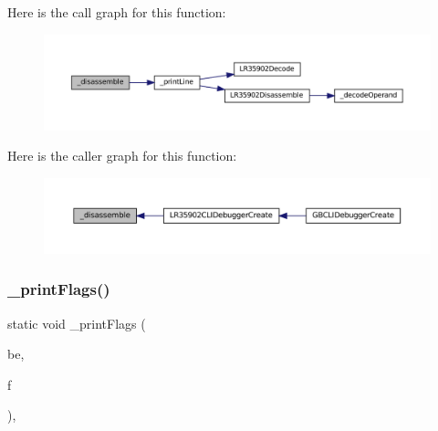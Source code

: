 Here is the call graph for this function\+:
\nopagebreak
\begin{figure}[H]
\begin{center}
\leavevmode
\includegraphics[width=350pt]{lr35902_2debugger_2cli-debugger_8c_ab744a20db75c627a6cf552eee9339cc0_cgraph}
\end{center}
\end{figure}
Here is the caller graph for this function\+:
\nopagebreak
\begin{figure}[H]
\begin{center}
\leavevmode
\includegraphics[width=350pt]{lr35902_2debugger_2cli-debugger_8c_ab744a20db75c627a6cf552eee9339cc0_icgraph}
\end{center}
\end{figure}
\mbox{\label{lr35902_2debugger_2cli-debugger_8c_a6f66f89891de505acabfc2381290bd70}} 
\subsubsection{\texorpdfstring{\+\_\+print\+Flags()}{\_printFlags()}}
{\footnotesize\ttfamily static void \+\_\+print\+Flags (\begin{DoxyParamCaption}\item[{struct C\+L\+I\+Debugger\+Backend $\ast$}]{be,  }\item[{union Flag\+Register}]{f }\end{DoxyParamCaption})\hspace{0.3cm}{\ttfamily [inline]}, {\ttfamily [static]}}


